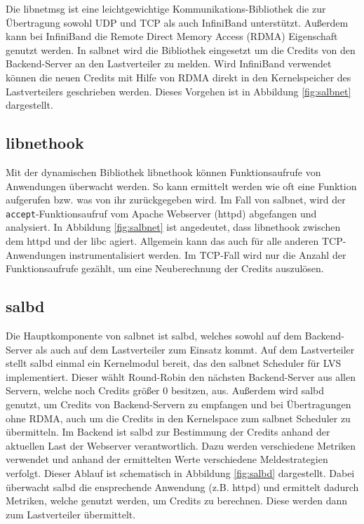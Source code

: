 \documentclass[a4paper, 12pt, BCOR10mm, DIV12, toc=bibliography, toc=listof, german]{scrbook}
\begin{document}
			Die libnetmsg \cite{rabweg2009} ist eine leichtgewichtige Kommunikations-Bibliothek die zur
			Übertragung sowohl UDP und TCP als auch InfiniBand unterstützt. Außerdem kann bei InfiniBand
			die Remote Direct Memory Access (RDMA) Eigenschaft genutzt werden. In salbnet wird die
			Bibliothek eingesetzt um die Credits von den Backend-Server an den Lastverteiler zu melden. Wird
			InfiniBand verwendet können die neuen Credits mit Hilfe von RDMA direkt in den Kernelspeicher
			des Lastverteilers geschrieben werden. Dieses Vorgehen ist in Abbildung \ref{fig:salbnet}
			dargestellt.

		
		\subsection*{libnethook} %

			Mit der dynamischen Bibliothek libnethook können Funktionsaufrufe von Anwendungen überwacht
			werden. So kann ermittelt werden wie oft eine Funktion aufgerufen bzw. was von ihr
			zurückgegeben wird. Im Fall von salbnet, wird der \texttt{accept}-Funktionsaufruf vom Apache
			Webserver (httpd) \cite{httpd} abgefangen und analysiert. In Abbildung \ref{fig:salbnet} ist
			angedeutet, dass libnethook zwischen dem httpd und der libc agiert. Allgemein kann das auch
			für alle anderen TCP-Anwendungen instrumentalisiert werden. Im TCP-Fall wird nur die Anzahl
			der Funktionsaufrufe gezählt, um eine Neuberechnung der Credits auszulösen.


		\subsection*{salbd} %

			Die Hauptkomponente von salbnet ist salbd, welches sowohl auf dem Backend-Server als auch auf
			dem Lastverteiler zum Einsatz kommt. Auf dem Lastverteiler stellt salbd einmal ein Kernelmodul
			bereit, das den salbnet Scheduler für LVS implementiert. Dieser wählt Round-Robin den
			nächsten Backend-Server aus allen Servern, welche noch Credits größer 0 besitzen, aus. Außerdem
			wird salbd genutzt, um Credits von Backend-Servern zu empfangen und bei Übertragungen
			ohne RDMA, auch um die Credits in den Kernelspace zum salbnet Scheduler zu übermitteln.  Im
			Backend ist salbd zur Bestimmung der Credits anhand der aktuellen Last der Webserver
			verantwortlich. Dazu werden verschiedene Metriken verwendet und anhand der ermittelten Werte
			verschiedene Meldestrategien verfolgt. Dieser Ablauf ist schematisch in Abbildung
			\ref{fig:salbd} dargestellt. Dabei überwacht salbd die ensprechende Anwendung (z.B.
			httpd) und ermittelt dadurch Metriken, welche genutzt werden, um Credits zu berechnen. Diese
			werden dann zum Lastverteiler übermittelt.
\end{document}
